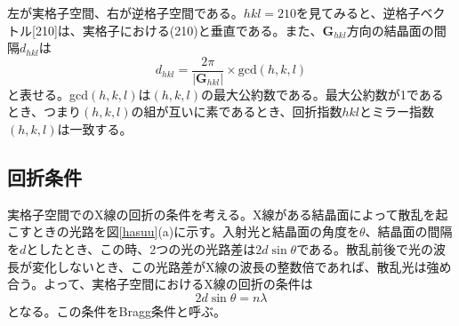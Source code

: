\documentclass[11pt,a4j,uplatex]{jsarticle}
\begin{document}
\newpage
左が実格子空間、右が逆格子空間である。$hkl=210$を見てみると、逆格子ベクトル[210]は、実格子における(210)と垂直である。また、$\bm{G}_{hkl}$方向の結晶面の間隔$d_{hkl}$は
\begin{equation}
  d_{hkl}=\frac{2\pi}{|\bm{G}_{hkl}|}\times \mathrm{gcd}(h,k,l)
\end{equation}
と表せる。gcd$(h,k,l)$は$(h,k,l)$の最大公約数である。最大公約数が1であるとき、つまり$(h,k,l)$の組が互いに素であるとき、回折指数$hkl$とミラー指数$(h,k,l)$は一致する。



\newpage
\subsection{回折条件}
実格子空間でのX線の回折の条件を考える。X線がある結晶面によって散乱を起こすときの光路を図\ref{hasuu}(a)に示す。入射光と結晶面の角度を$\theta$、結晶面の間隔を$d$としたとき、この時、2つの光の光路差は$2d\sin\theta$である。散乱前後で光の波長が変化しないとき、この光路差がX線の波長の整数倍であれば、散乱光は強め合う。よって、実格子空間におけるX線の回折の条件は
\begin{equation}
 2d\sin\theta=n\lambda
 \label{bragg}
\end{equation}
となる。この条件をBragg条件と呼ぶ。
\end{document}
